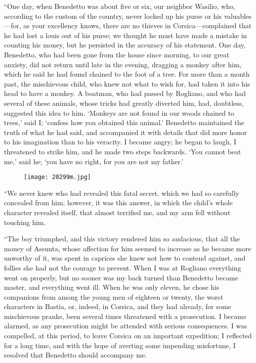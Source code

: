 “One day, when Benedetto was about five or six, our neighbor Wasilio,
who, according to the custom of the country, never locked up his purse
or his valuables—for, as your excellency knows, there are no thieves in
Corsica—complained that he had lost a louis out of his purse; we
thought he must have made a mistake in counting his money, but he
persisted in the accuracy of his statement. One day, Benedetto, who had
been gone from the house since morning, to our great anxiety, did not
return until late in the evening, dragging a monkey after him, which he
said he had found chained to the foot of a tree. For more than a month
past, the mischievous child, who knew not what to wish for, had taken
it into his head to have a monkey. A boatman, who had passed by
Rogliano, and who had several of these animals, whose tricks had
greatly diverted him, had, doubtless, suggested this idea to him.
‘Monkeys are not found in our woods chained to trees,’ said I; ‘confess
how you obtained this animal.’ Benedetto maintained the truth of what
he had said, and accompanied it with details that did more honor to his
imagination than to his veracity. I became angry; he began to laugh, I
threatened to strike him, and he made two steps backwards. ‘You cannot
beat me,’ said he; ‘you have no right, for you are not my father.’

\begin{figure}[ht]
\texttt{[image: 20299m.jpg]}
\end{figure}

“We never knew who had revealed this fatal secret, which we had so
carefully concealed from him; however, it was this answer, in which the
child’s whole character revealed itself, that almost terrified me, and
my arm fell without touching him.

“The boy triumphed, and this victory rendered him so audacious, that
all the money of Assunta, whose affection for him seemed to increase as
he became more unworthy of it, was spent in caprices she knew not how
to contend against, and follies she had not the courage to prevent.
When I was at Rogliano everything went on properly, but no sooner was
my back turned than Benedetto became master, and everything went ill.
When he was only eleven, he chose his companions from among the young
men of eighteen or twenty, the worst characters in Bastia, or, indeed,
in Corsica, and they had already, for some mischievous pranks, been
several times threatened with a prosecution. I became alarmed, as any
prosecution might be attended with serious consequences. I was
compelled, at this period, to leave Corsica on an important expedition;
I reflected for a long time, and with the hope of averting some
impending misfortune, I resolved that Benedetto should accompany me.

